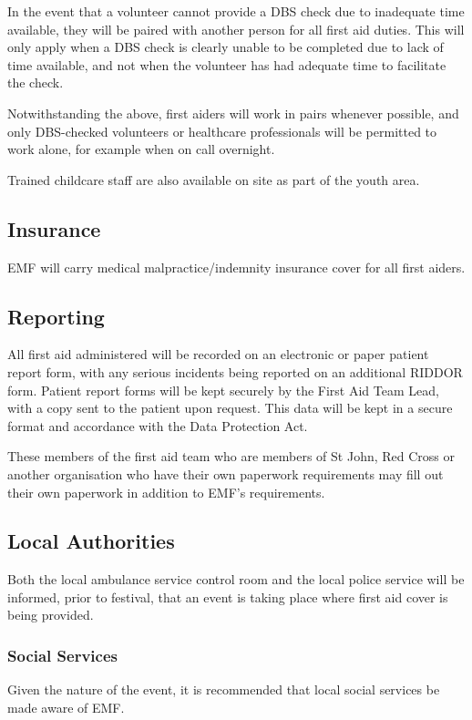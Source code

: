 In the event that a volunteer cannot provide a DBS check due to inadequate time
available, they will be paired with another person for all first aid duties.
This will only apply when a DBS check is clearly unable to be completed due to
lack of time available, and not when the volunteer has had adequate time to
facilitate the check.

Notwithstanding the above, first aiders will work in pairs whenever possible, and
only DBS-checked volunteers or healthcare professionals will be permitted to work
alone, for example when on call overnight.

Trained childcare staff are also available on site as part of the youth area.

\subsection{Insurance}
EMF will carry medical malpractice/indemnity insurance cover for all first aiders.

\subsection{Reporting}
All first aid administered will be recorded on an electronic or paper
patient report form, with any serious incidents being reported on an
additional RIDDOR form. Patient report forms will be kept securely by the First
Aid Team Lead, with a copy sent to the patient upon request. This
data will be kept in a secure format and accordance with the Data Protection
Act.

These members of the first aid team who are members of St John, Red Cross or another
organisation who have their own paperwork requirements may fill out their own paperwork
in addition to EMF's requirements.

\subsection{Local Authorities}
Both the local ambulance service control room and the local police service will
be informed, prior to festival, that an event is taking place where first aid
cover is being provided.

\subsubsection{Social Services}

Given the nature of the event, it is recommended that local social services be
made aware of EMF.

